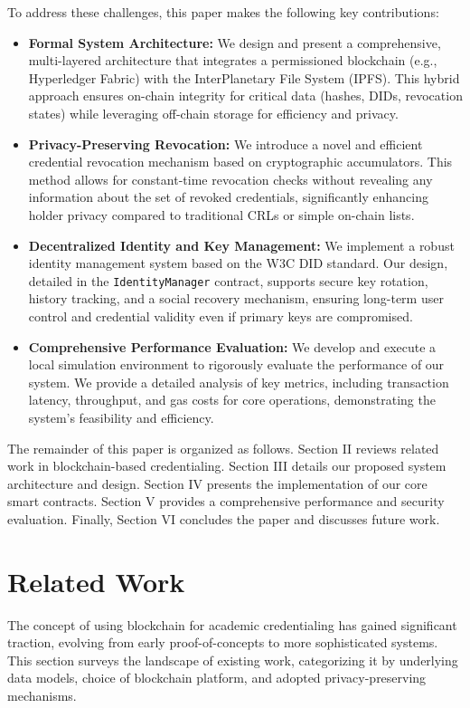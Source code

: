 \documentclass[lettersize,journal]{IEEEtran}
\begin{document}
To address these challenges, this paper makes the following key contributions:
\begin{itemize}
    \item \textbf{Formal System Architecture:} We design and present a comprehensive, multi-layered architecture that integrates a permissioned blockchain (e.g., Hyperledger Fabric) with the InterPlanetary File System (IPFS). This hybrid approach ensures on-chain integrity for critical data (hashes, DIDs, revocation states) while leveraging off-chain storage for efficiency and privacy.
    \item \textbf{Privacy-Preserving Revocation:} We introduce a novel and efficient credential revocation mechanism based on cryptographic accumulators. This method allows for constant-time revocation checks without revealing any information about the set of revoked credentials, significantly enhancing holder privacy compared to traditional CRLs or simple on-chain lists.
    \item \textbf{Decentralized Identity and Key Management:} We implement a robust identity management system based on the W3C DID standard. Our design, detailed in the \texttt{IdentityManager} contract, supports secure key rotation, history tracking, and a social recovery mechanism, ensuring long-term user control and credential validity even if primary keys are compromised.
    \item \textbf{Comprehensive Performance Evaluation:} We develop and execute a local simulation environment to rigorously evaluate the performance of our system. We provide a detailed analysis of key metrics, including transaction latency, throughput, and gas costs for core operations, demonstrating the system's feasibility and efficiency.
\end{itemize}

The remainder of this paper is organized as follows. Section II reviews related work in blockchain-based credentialing. Section III details our proposed system architecture and design. Section IV presents the implementation of our core smart contracts. Section V provides a comprehensive performance and security evaluation. Finally, Section VI concludes the paper and discusses future work.

\section{Related Work}
The concept of using blockchain for academic credentialing has gained significant traction, evolving from early proof-of-concepts to more sophisticated systems. This section surveys the landscape of existing work, categorizing it by underlying data models, choice of blockchain platform, and adopted privacy-preserving mechanisms.
\end{document}
